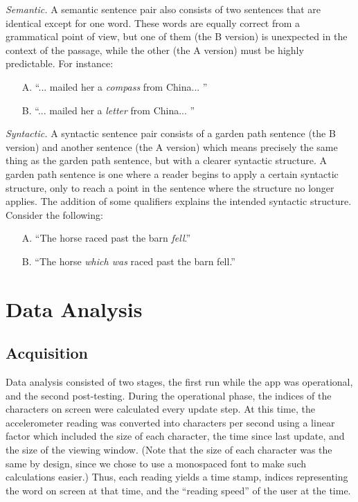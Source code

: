 \documentclass[11pt,letterpaper]{article}
\begin{document}
	\textit{Semantic.} A semantic sentence pair also consists of two sentences that are identical except for one word. These words are equally correct from a grammatical point of view, but one of them (the B version) is unexpected in the context of the passage, while the other (the A version) must be highly predictable. For instance:
	\begin{itemize}[noitemsep, nolistsep]
		\item[A.] ``... mailed her a \textit{compass} from China... ''
		\item[B.] ``... mailed her a \textit{letter} from China... ''
	\end{itemize}
	
	\textit{Syntactic.} A syntactic sentence pair consists of a garden path sentence (the B version) and another sentence (the A version) which means precisely the same thing as the garden path sentence, but with a clearer syntactic structure. A garden path sentence is one where a reader begins to apply a certain syntactic structure, only to reach a point in the sentence where the structure no longer applies. The addition of some qualifiers explains the intended syntactic structure. Consider the following:
	\begin{itemize}[noitemsep, nolistsep]
		\item[A.] ``The horse raced past the barn \textit{fell}.''
		\item[B.] ``The horse \textit{which was} raced past the barn fell.''
	\end{itemize}
	
	\section{Data Analysis}
	
	\subsection{Acquisition}
	
	Data analysis consisted of two stages, the first run while the app was operational, and the second post-testing. During the operational phase, the indices of the characters on screen were calculated every update step. At this time, the accelerometer reading was converted into characters per second using a linear factor which included the size of each character, the time since last update, and the size of the viewing window. (Note that the size of each character was the same by design, since we chose to use a monospaced font to make such calculations easier.) Thus, each reading yields a time stamp, indices representing the word on screen at that time, and the ``reading speed'' of the user at the time.
	
\end{document}
